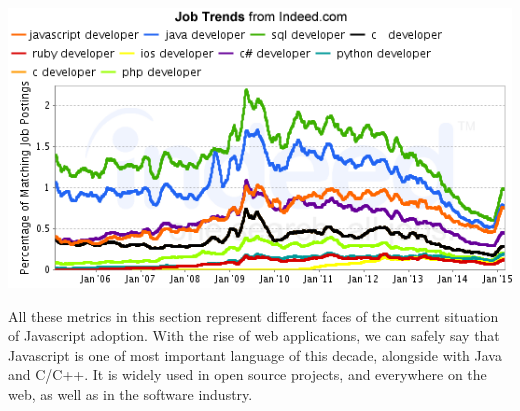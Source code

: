 \includegraphics[width=0.9\linewidth]{../../data/js-trends/jobgraph}



All these metrics in this section represent different faces of the current situation of Javascript adoption.
With the rise of web applications, we can safely say that Javascript is one of most important language of this decade, alongside with Java and C/C++.
It is widely used in open source projects, and everywhere on the web, as well as in the software industry.
